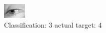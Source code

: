 \begin{figure}[h!]
\begin{center}
\includegraphics[width=0.60\columnwidth]{figures/ID2986_class_3_target_4.png}
\end{center}
\caption{ Classification: 3 actual target: 4}
\label{fig:ID2986_class_3_target_4}
\end{figure}
